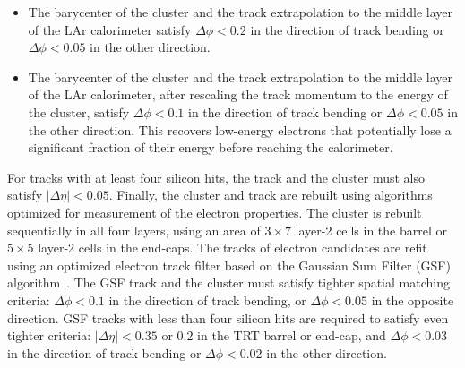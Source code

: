\begin{itemize}
	\item The barycenter of the cluster and the track extrapolation to the middle layer of the LAr calorimeter satisfy $\Delta\phi<0.2$ in the direction of track bending or $\Delta\phi<0.05$ in the other direction. 
	\item The barycenter of the cluster and the track extrapolation to the middle layer of the LAr calorimeter, after rescaling the track momentum to the energy of the cluster, satisfy $\Delta\phi<0.1$ in the direction of track bending or $\Delta\phi<0.05$ in the other direction. This recovers low-energy electrons that potentially lose a significant fraction of their energy before reaching the calorimeter. 
\end{itemize}
 
For tracks with at least four silicon hits, the track and the cluster must also satisfy $|\Delta\eta|<0.05$. Finally, the cluster and track are rebuilt using algorithms optimized for measurement of the electron properties. The cluster is rebuilt sequentially in all four layers, using an area of $3\times7$ layer-2 cells in the barrel or $5\times5$ layer-2 cells in the end-caps. The tracks of electron candidates are refit using an optimized electron track filter based on the Gaussian Sum Filter (GSF) algorithm~\cite{TheATLASCollaboration:2012vr}. The GSF track and the cluster must satisfy tighter spatial matching criteria: $\Delta\phi<0.1$ in the direction of track bending, or $\Delta\phi<0.05$ in the opposite direction. GSF tracks with less than four silicon hits are required to satisfy even tighter criteria: $|\Delta\eta|<0.35$ or $0.2$ in the TRT barrel or end-cap, and $\Delta\phi<0.03$ in the direction of track bending or $\Delta\phi<0.02$ in the other direction. 

